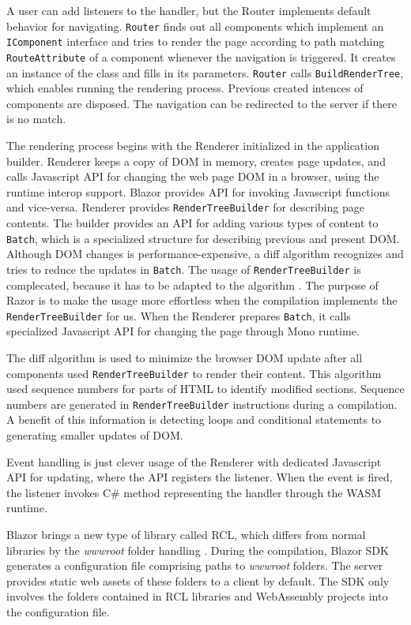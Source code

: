 A user can add listeners to the handler, but the Router implements default behavior for navigating.
\texttt{Router} finds out all components which implement an \texttt{IComponent} interface and tries to render the page according to path matching \texttt{RouteAttribute} of a component whenever the navigation is triggered.
It creates an instance of the class and fills in its parameters.
\texttt{Router} calls \texttt{BuildRenderTree}, which enables running the rendering process.
Previous created intences of components are disposed.
The navigation can be redirected to the server if there is no match.
\par
The rendering process begins with the Renderer initialized in the application builder.
Renderer keeps a copy of DOM in memory, creates page updates, and calls Javascript API for changing the web page DOM in a browser, using the runtime interop support.
Blazor provides API for invoking Javascript functions and vice-versa.
Renderer provides \texttt{RenderTreeBuilder} for describing page contents.
The builder provides an API for adding various types of content to \texttt{Batch}, which is a specialized structure for describing previous and present DOM.
Although DOM changes is performance-expensive, a diff algorithm \cite{online:diffAlgorithm} recognizes and tries to reduce the updates in \texttt{Batch}.
The usage of \texttt{RenderTreeBuilder} is complecated, because it has to be adapted to the algorithm \cite{online:renderTree}.
The purpose of Razor is to make the usage more effortless when the compilation implements the \texttt{RenderTreeBuilder} for us.
When the Renderer prepares \texttt{Batch}, it calls specialized Javascript API for changing the page through Mono runtime.
\par
The diff algorithm is used to minimize the browser DOM  update after all components used \texttt{RenderTreeBuilder} to render their content.
This algorithm used sequence numbers for parts of HTML to identify modified sections.
Sequence numbers are generated in \texttt{RenderTreeBuilder} instructions during a compilation.
A benefit of this information is detecting loops and conditional statements to generating smaller updates of DOM.  
\par
Event handling is just clever usage of the Renderer with dedicated Javascript API for updating, where the API registers the listener.
When the event is fired, the listener invokes C\# method representing the handler through the WASM runtime.
\par
Blazor brings a new type of library called \ac{RCL}, which differs from normal libraries by the \textit{wwwroot} folder handling \cite{online:rcl}.
During the compilation, Blazor \ac{SDK} generates a configuration file comprising paths to \textit{wwwroot} folders.
The server provides static web assets of these folders to a client by default.
The SDK only involves the folders contained in RCL libraries and WebAssembly projects into the configuration file.

